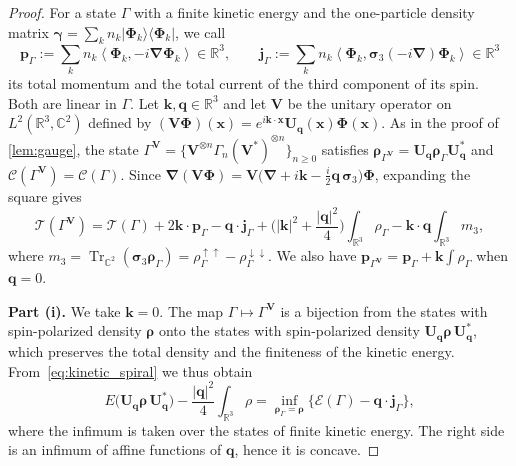 \documentclass[final,reqno]{amsart}
\theoremstyle{remark}
\renewcommand{\ge}{\geqslant}
\newcommand{\spu}{\uparrow}
\newcommand{\spd}{\downarrow}
\DeclareMathOperator{\Tr}{Tr}
\newcommand{\Trs}{\Tr_{\CC^2}}
\newcommand{\RR}{\mathbb{R}}
\newcommand{\CC}{\mathbb{C}}
\newcommand{\pscal}[1]{\left\langle #1 \right\rangle}
\newcommand{\grad}{\bm{\nabla}}
\newcommand{\TC}{\mathcal{T}}
\newcommand{\EC}{\mathcal{E}}
\newcommand{\Cc}{\mathcal{C}}
\begin{document}
\begin{proof}
For a state $\Gamma$ with a finite kinetic energy and the one-particle density matrix $\bm{\gamma}=\sum_kn_k|\bm{\Phi}_k\rangle\langle\bm{\Phi}_k|$, we call
$$
\mathbf{p}_\Gamma:=\sum_kn_k\pscal{\bm{\Phi}_k,-i\grad\bm{\Phi}_k}\in\RR^3,\qquad \mathbf{j}_\Gamma:=\sum_kn_k\pscal{\bm{\Phi}_k,\bm{\sigma}_3(-i\grad)\bm{\Phi}_k}\in\RR^3
$$
its total momentum and the total current of the third component of its spin. Both are linear in $\Gamma$. Let $\mathbf{k},\mathbf{q}\in\RR^3$ and let $\mathbf{V}$ be the unitary operator on $L^2(\RR^3,\CC^2)$ defined by $(\mathbf{V}\bm{\Phi})(\mathbf{x})=e^{i\mathbf{k}\cdot\mathbf{x}}\mathbf{U}_{\mathbf{q}}(\mathbf{x})\bm{\Phi}(\mathbf{x})$. As in the proof of \cref{lem:gauge}, the state $\Gamma^{\mathbf{V}}=\{\mathbf{V}^{\otimes n}\Gamma_n(\mathbf{V}^*)^{\otimes n}\}_{n\ge0}$ satisfies $\bm{\rho}_{\Gamma^{\mathbf{V}}}=\mathbf{U}_{\mathbf{q}}\bm{\rho}_\Gamma\mathbf{U}_{\mathbf{q}}^*$ and $\Cc(\Gamma^{\mathbf{V}})=\Cc(\Gamma)$. Since $\grad(\mathbf{V}\bm{\Phi})=\mathbf{V}\big(\grad+i\mathbf{k}-\frac i2\mathbf{q}\,\bm{\sigma}_3\big)\bm{\Phi}$, expanding the square gives
\begin{equation}\label{eq:kinetic_spiral}
\TC(\Gamma^{\mathbf{V}})=\TC(\Gamma)+2\mathbf{k}\cdot\mathbf{p}_\Gamma-\mathbf{q}\cdot\mathbf{j}_\Gamma+\Big(|\mathbf{k}|^2+\frac{|\mathbf{q}|^2}4\Big)\int_{\RR^3}\rho_\Gamma-\mathbf{k}\cdot\mathbf{q}\int_{\RR^3}m_3,
\end{equation}
where $m_3=\Trs(\bm{\sigma}_3\bm{\rho}_\Gamma)=\rho_\Gamma^{\spu\spu}-\rho_\Gamma^{\spd\spd}$. We also have $\mathbf{p}_{\Gamma^{\mathbf{V}}}=\mathbf{p}_\Gamma+\mathbf{k}\int\rho_\Gamma$ when $\mathbf{q}=0$.

\medskip

\noindent\textbf{Part (i).} We take $\mathbf{k}=0$. The map $\Gamma\mapsto\Gamma^{\mathbf{V}}$ is a bijection from the states with spin-polarized density $\bm{\rho}$ onto the states with spin-polarized density $\mathbf{U}_{\mathbf{q}}\bm{\rho}\,\mathbf{U}_{\mathbf{q}}^*$, which preserves the total density and the finiteness of the kinetic energy. From~\cref{eq:kinetic_spiral} we thus obtain
\begin{equation}\label{eq:spiral_formula}
E\big(\mathbf{U}_{\mathbf{q}}\bm{\rho}\,\mathbf{U}_{\mathbf{q}}^*\big)-\frac{|\mathbf{q}|^2}{4}\int_{\RR^3}\rho=\inf_{\bm{\rho}_\Gamma=\bm{\rho}}\Big\{\EC(\Gamma)-\mathbf{q}\cdot\mathbf{j}_\Gamma\Big\},
\end{equation}
where the infimum is taken over the states of finite kinetic energy. The right side is an infimum of affine functions of $\mathbf{q}$, hence it is concave.


\end{proof}
\end{document}
